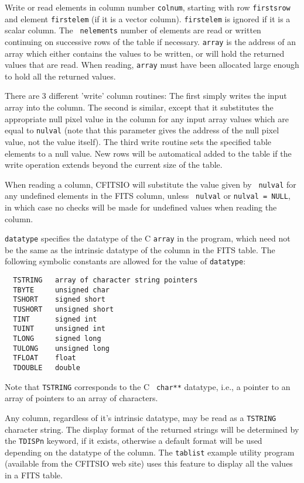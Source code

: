 \documentclass[11pt]{article}
\begin{document}
Write or read elements in column number {\tt colnum}, starting with row
{\tt firstsrow} and element {\tt firstelem} (if it is a vector
column).  {\tt firstelem} is ignored if it is a scalar column. The {\tt
nelements} number of elements are read or written continuing on
successive rows of the table if necessary. {\tt array} is the address
of an array which either contains the  values to be written, or will
hold the returned values that are read.  When reading, {\tt array} must
have been allocated large enough to hold all the returned values.

There are 3 different 'write' column routines:  The first simply writes
the input array into the column.  The second is similar, except that it
substitutes the appropriate null pixel value in the column for any
input array values which are equal to {\tt *nulval} (note that this
parameter gives the address of the null pixel value, not the value
itself).  The third write routine sets the specified table elements
to a null value.  New rows will be automatical added to the table
if the write operation extends beyond the current size of the table.

When reading a column, CFITSIO will substitute the value given by {\tt
nulval}  for  any undefined elements in the FITS column, unless {\tt
nulval} or {\tt *nulval = NULL}, in which case no checks will be made
for undefined values when reading the column.

{\tt datatype} specifies the datatype of the C {\tt array} in the program,
which need not be the same as the intrinsic datatype of the column in
the FITS table.   The following symbolic constants are allowed for the
value of {\tt datatype}:

\begin{verbatim}
  TSTRING   array of character string pointers
  TBYTE     unsigned char
  TSHORT    signed short
  TUSHORT   unsigned short
  TINT      signed int
  TUINT     unsigned int
  TLONG     signed long
  TULONG    unsigned long
  TFLOAT    float
  TDOUBLE   double
\end{verbatim}

Note that {\tt TSTRING} corresponds to the C {\tt
char**} datatype, i.e., a pointer to an array of pointers to an array
of characters.

Any column, regardless of it's intrinsic datatype, may be read as a
{\tt TSTRING} character string. The display format of the returned
strings will be determined by the {\tt TDISPn} keyword, if it exists,
otherwise a default format will be used depending on the datatype of
the column.  The {\tt tablist} example utility program (available from
the CFITSIO web site) uses this feature to display all the values in a
FITS table.
\end{document}
